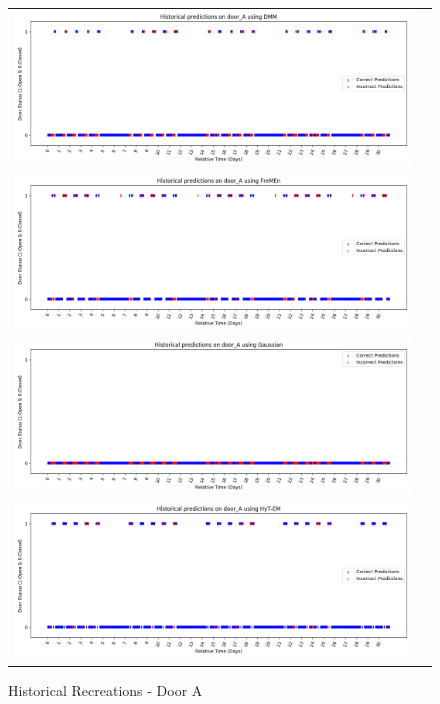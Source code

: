 \begin{center}
  \begin{figure}[!Hp]
  \begin{tabular}{cc}
    {\includegraphics[width = 6in]{images/results/Historical_door_A_DMM.png}} \\
    {\includegraphics[width = 6in]{images/results/Historical_door_A_FreMEn.png}} \\
    {\includegraphics[width = 6in]{images/results/Historical_door_A_Gaussian.png}} \\
    {\includegraphics[width = 6in]{images/results/Historical_door_A_HyT-EM.png}} \\
  \end{tabular}
  \caption{Historical Recreations - Door A}
  \label{figure:historical_door_A}
\end{figure} \\ \\


\end{center}
